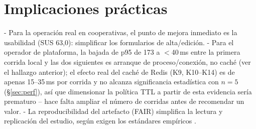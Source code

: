 \section{Implicaciones prácticas}

- Para la operación real en cooperativas, el punto de mejora inmediato es la
  usabilidad (SUS 63,0): simplificar los formularios de alta/edición.
- Para el operador de plataforma, la bajada de p95 de 173 a $<$40\,ms entre la
  primera corrida local y las dos siguientes es arranque de proceso/conexión,
  no caché (ver el hallazgo anterior); el efecto real del caché de Redis
  (K9, K10--K14) es de apenas 15--35\,ms por corrida y no alcanza
  significancia estadística con $n=5$ (\S\ref{sec:perf}), así que
  dimensionar la política TTL a partir de esta evidencia sería prematuro --
  hace falta ampliar el número de corridas antes de recomendar un valor.
- La reproducibilidad del artefacto (FAIR) simplifica la lectura y replicación del
  estudio, según exigen los estándares empíricos \cite{ralph2021,prisma2021}.